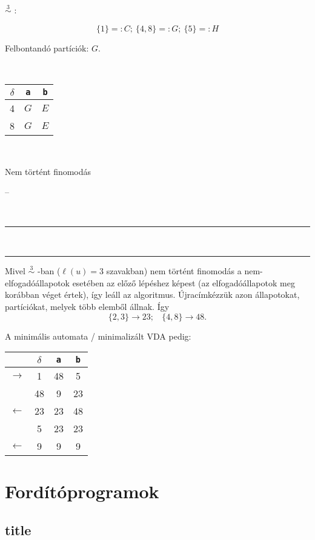 \documentclass[a4paper,11pt]{article}
\newcommand{\partition}[1]{\stackrel{#1}{\sim}}
\begin{document}
\begin{minipage}{0.1\linewidth}
	$\partition{3}$ :
\end{minipage}
\begin{minipage}{0.45\linewidth}
	\[ \{1\}=: C; ~ \{4,8\}=:G; ~ \{5\} =:H \]
	\begin{center}
		Felbontandó partíciók: $G$.
		
		~
		
		\begin{tabular}{c|cc}
			$\delta$ & \texttt{a} & \texttt{b} \\
			\hline
			4 & $G$ & $E$ \\
			8 & $G$ & $E$ \\
		\end{tabular}
		
		~
		
		Nem történt finomodás
	\end{center}
\end{minipage}
\begin{minipage}{0.45\linewidth}
	\begin{center}
		--
	\end{center}
\end{minipage}

~\\[-1em]

\hrule

~\\[-1.5em]

\hrule

Mivel $\partition{3}$ -ban ($\ell(u)=3$ szavakban) nem történt finomodás a nem-elfogadóállapotok esetében az előző lépéshez képest (az elfogadóállapotok meg korábban véget értek), így leáll az algoritmus. Újracímkézzük azon állapotokat, partíciókat, melyek több elemből állnak. Így 
\[ \{2,3\} \to 23; ~~~~ \{4,8\} \to 48. \] 

A minimális automata / minimalizált VDA pedig:

\begin{center}
	\setlength{\tabcolsep}{1em} %
	{\renewcommand{\arraystretch}{1.25}%
		\begin{tabular}{cc||c|c}
			& $\delta$ & \texttt{a} & \texttt{b} \\
			\hline
			$\rightarrow$ & 1 & 48 & 5 \\
			& 48 & 9 & 23 \\
			$\leftarrow$ & 23 & 23 & 48 \\
			& 5 & 23 & 23 \\
			$\leftarrow$ & 9 & 9 & 9
		\end{tabular}
	}
\end{center}

\section{Fordítóprogramok}

\subsection{title}
\end{document}

